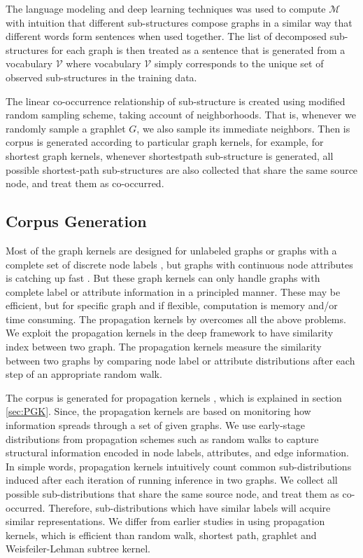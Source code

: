 The language modeling and deep learning techniques was used to compute $\mathcal{M}$ with intuition that different sub-structures compose graphs in a similar way that different words form sentences when used together. The list of decomposed sub-structures for each graph is then treated as a sentence that is generated from a vocabulary $\mathcal{V}$  where vocabulary $\mathcal{V}$ simply corresponds to the unique set of observed sub-structures in the training data. 

The linear co-occurrence relationship of sub-structure is created using modified random sampling scheme, taking account of neighborhoods. That is, whenever we randomly sample a graphlet $G$, we also sample its immediate neighbors. Then is corpus is generated according to particular graph kernels, for example, for shortest graph kernels, whenever shortestpath sub-structure is generated, all possible shortest-path sub-structures are also collected that share the same source node, and treat them as co-occurred.

\subsection{Corpus Generation}

Most of the graph kernels \citep{Vishwanathan2010} are designed for unlabeled graphs or graphs with a complete set of discrete node labels
, but graphs with continuous node attributes is catching up fast \citep{Feragen2013}. But these graph kernels can only handle graphs with complete label or attribute information in a principled manner. These may be efficient, but for specific graph and if flexible, computation is memory and/or time consuming. The propagation kernels by  \citep{Neumann2015} overcomes all the above problems. We exploit the propagation kernels in the deep framework to have similarity index between two graph. The propagation kernels measure the similarity between two graphs by comparing node label or attribute distributions after each step of an appropriate random walk.

The corpus is generated for propagation kernels \citep{Neumann2015}, which is explained in section \ref{sec:PGK}. Since, the propagation kernels are based on monitoring how information spreads through a set of given graphs. We use early-stage distributions from propagation
schemes such as random walks to capture structural information encoded in node labels, attributes, and edge information. In simple words, propagation kernels intuitively count common sub-distributions induced
after each iteration of running inference in two graphs. We collect all possible sub-distributions that share the same source node, and treat them as co-occurred. Therefore, sub-distributions which have similar labels will acquire similar representations. We differ from earlier studies in using propagation kernels, which is efficient than random walk, shortest path, graphlet and Weisfeiler-Lehman subtree kernel.


